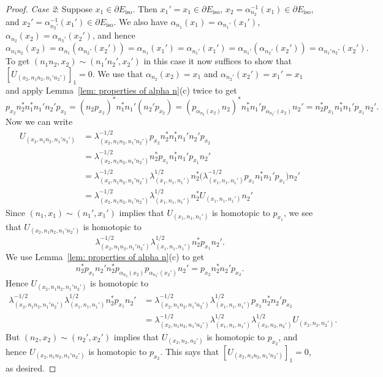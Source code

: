 \documentclass[12pt, a4paper]{amsart}
\numberwithin{equation}{section}
\theoremstyle{definition}
\theoremstyle{remark}
\begin{document}
\begin{proof}
\emph{Case 2}: Suppose $x_1 \in \partial E_{{\operatorname{iso}}}$. Then $x_1'=x_1 \in \partial 
E_{{\operatorname{iso}}}$, $x_2=\alpha_{n_2}^{-1}(x_1) \in \partial E_{{\operatorname{iso}}}$, and 
$x_2'=\alpha_{n_2'}^{-1}(x_1') \in \partial E_{{\operatorname{iso}}}$. We also have 
$\alpha_{n_1}(x_1)=\alpha_{n_1'}(x_1')$, 
$\alpha_{n_2}(x_2)=\alpha_{n_2'}(x_2')$, and hence
\[
\alpha_{n_1 
n_2}(x_2)=\alpha_{n_1}(\alpha_{n_2'}(x_2'))=\alpha_{n_1}(x_1')=\alpha_{n_1'}(x_1')=\alpha_{n_1'}(\alpha_{n_2'}(x_2'))=\alpha_{n_1'n_2'}(x_2').
\]
To get $(n_1n_2,x_2)\sim(n_1'n_2',x_2')$ in this case it now suffices to show 
that
$[U_{(x_2,n_1n_2,n_1'n_2')}]_1=0$.
We use that $\alpha_{n_2}(x_2)=x_1$ and $\alpha_{n_2'}(x_2')=x_1'=x_1$ and 
apply Lemma~\ref{lem: properties of alpha n}(c) twice to get
\[
p_{x_2}n_2^*n_1^*n_1'n_2'p_{x_2} = (n_2p_{x_2})^*n_1^*n_1'(n_2'p_{x_2})=
(p_{\alpha_{n_2}(x_2)}n_2)^*n_1^*n_1'p_{\alpha_{n_2'}(x_2)}n_2'= 
n_2^*p_{x_1}n_1^*n_1'p_{x_1}n_2'.
\]
Now we can write
\begin{align*}
U_{(x_2,n_1n_2,n_1'n_2')} &= 
\lambda_{(x_2,n_1n_2,n_1'n_2')}^{-1/2}p_{x_2}n_2^*n_1^*n_1'n_2'p_{x_2}\\
&= 
\lambda_{(x_2,n_1n_2,n_1'n_2')}^{-1/2}n_2^*p_{x_1}n_1^*n_1'p_{x_1}n_2'\\
&= \lambda_{(x_2,n_1n_2,n_1'n_2')}^{-1/2}\lambda_{(x_1,n_1,n_1')}^{1/2}
n_2^*\big(\lambda_{(x_1,n_1,n_1')}^{-1/2}p_{x_1}n_1^*n_1'p_{x_1}\big)
n_2'\\
&=\lambda_{(x_2,n_1n_2,n_1'n_2')}^{-1/2}\lambda_{(x_1,n_1,n_1')}^{1/2}
n_2^*U_{(x_1,n_1,n_1')}n_2'
\end{align*} 
Since $(n_1,x_1)\sim (n_1',x_1')$ implies that $U_{(x_1,n_1,n_1')}$ is 
homotopic to $p_{x_1}$, we see that $U_{(x_2,n_1n_2,n_1'n_2')}$ is homotopic to
\[
\lambda_{(x_2,n_1n_2,n_1'n_2')}^{-1/2}\lambda_{(x_1,n_1,n_1')}^{1/2}
n_2^*p_{x_1}n_2'.
\]
We use Lemma~\ref{lem: properties of alpha n}(c) to get
\[
n_2^*p_{x_1}n_2'n_2^*p_{\alpha_{n_2}(x_2)}p_{\alpha_{n_2'}(x_2')}n_2'
=p_{x_2}n_2^*n_2'p_{x_2}.
\]
Hence $U_{(x_2,n_1n_2,n_1'n_2')}$ is homotopic to
\begin{align*}
\lambda_{(x_2,n_1n_2,n_1'n_2')}^{-1/2}\lambda_{(x_1,n_1,n_1')}^{1/2}
n_2^*p_{x_1}n_2'&=\lambda_{(x_2,n_1n_2,n_1'n_2')}^{-1/2}
\lambda_{(x_1,n_1,n_1')}^{1/2}
p_{x_2}n_2^*n_2'p_{x_2}\\
&=\lambda_{(x_2,n_1n_2,n_1'n_2')}^{-1/2}
\lambda_{(x_1,n_1,n_1')}^{1/2}\lambda_{(x_2,n_2,n_2')}^{1/2}
U_{(x_2,n_2,n_2')}.
\end{align*}
But $(n_2,x_2)\sim (n_2',x_2')$ implies that $U_{(x_2,n_2,n_2')}$ is 
homotopic to $p_{x_2}$, and hence $U_{(x_2,n_1n_2,n_1'n_2')}$ is homotopic to 
$p_{x_2}$. This says that $[U_{(x_2,n_1n_2,n_1'n_2')}]_1=0$, as desired.


\end{proof}
\end{document}
